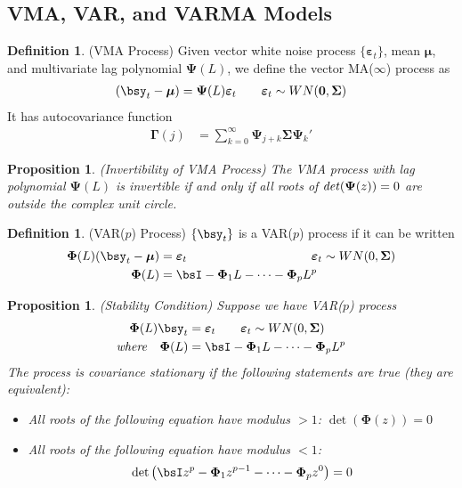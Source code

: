 \documentclass[12pt]{article}
\theoremstyle{plain}
\newtheorem{prop}[thm]{Proposition}
\theoremstyle{definition}
\newtheorem{defn}[thm]{Definition}
\theoremstyle{remark}
\newcommand{\bsmu}{\boldsymbol{\mu}}
\newcommand{\bsSigma}{\boldsymbol{\Sigma}}
\newcommand{\bsvarepsilon}{\boldsymbol{\varepsilon}}
\newcommand{\bsGamma}{\boldsymbol{\Gamma}}
\newcommand{\bsPsi}{\boldsymbol{\Psi}}
\newcommand{\bsPhi}{\boldsymbol{\Phi}}
\renewcommand{\bso}{\boldsymbol{0}}
\begin{document}
\clearpage
\subsection{VMA, VAR, and VARMA Models}

\begin{defn}(VMA Process)
Given vector white noise process $\{\bsvarepsilon_t\}$, mean $\bsmu$,
and multivariate lag polynomial $\bsPsi(L)$, we define the vector
MA($\infty$) process as
\begin{align*}
  (\bsy_t - \bsmu) = \bsPsi(L)\bsvarepsilon_t
  \qquad \bsvarepsilon_t \sim WN(\bso,\bsSigma)
\end{align*}
It has autocovariance function
\begin{align*}
  \bsGamma(j)
  &= \sum_{k=0}^\infty \bsPsi_{j+k}\bsSigma\bsPsi_k'
\end{align*}
\end{defn}

\begin{prop}\emph{(Invertibility of VMA Process)}
The VMA process with lag polynomial $\bsPsi(L)$ is invertible if and
only if all roots of $\text{\emph{det}}(\bsPsi(z))=0$ are outside the
complex unit circle.
\end{prop}

\begin{defn}(VAR($p$) Process)
$\{\bsy_t\}$ is a VAR($p$) process if it can be written
\begin{align*}
  \bsPhi(L)(\bsy_t-\bsmu) &= \bsvarepsilon_t
  \qquad\qquad\qquad\qquad\qquad \bsvarepsilon_t\sim WN(0,\bsSigma)
  \\
  \bsPhi(L) &= \bsI - \bsPhi_1 L - \cdots - \bsPhi_pL^p
\end{align*}
\end{defn}

\begin{prop}\emph{(Stability Condition)}
Suppose we have VAR($p$) process
\begin{align*}
  \bsPhi(L)\bsy_t &= \bsvarepsilon_t
  \qquad \bsvarepsilon_t \sim WN(0,\bsSigma)
  \\
  \text{\emph{where}}\quad
  \bsPhi(L) &= \bsI - \bsPhi_1 L - \cdots - \bsPhi_pL^p
\end{align*}
The process is covariance stationary if the following statements are
true (they are equivalent):
\begin{itemize}
  \item
    All roots of the following equation have modulus $>1$:
    $\det(\bsPhi(z)) = 0$
  \item
    All roots of the following equation have modulus $<1$:
    \begin{align*}
      \det\big(
        \bsI z^p - \bsPhi_1z^{p-1}
        - \cdots - \bsPhi_p z^0
      \big)
      =0
    \end{align*}
\end{itemize}
\end{prop}
\end{document}
